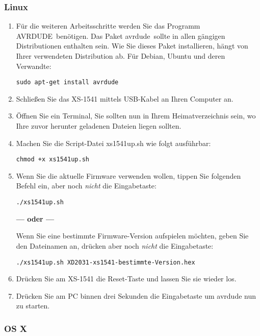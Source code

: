 \documentclass[10pt,a4paper]{scrartcl}		%
\begin{document}
\subsubsection*{Linux}
\begin{enumerate}
\item Für die weiteren Arbeitsschritte werden Sie das Programm
\glqq AVRDUDE\grqq\ benötigen.  
Das Paket \glqq avrdude\grqq\ sollte in allen gängigen Distributionen
enthalten sein. Wie Sie dieses Paket installieren, hängt von Ihrer
verwendeten Distribution ab. Für Debian, Ubuntu und deren Verwandte:

\texttt{sudo apt-get install avrdude}

\item Schließen Sie das XS-1541 mittels USB-Kabel an Ihren Computer an.
\item Öffnen Sie ein Terminal, Sie sollten nun in Ihrem Heimatverzeichnis
sein, wo Ihre zuvor herunter geladenen Dateien liegen sollten.
\item Machen Sie die Script-Datei xs1541up.sh wie folgt ausführbar:

\texttt{chmod +x xs1541up.sh}
\item Wenn Sie die aktuelle Firmware verwenden wollen, tippen Sie
	folgenden Befehl ein, aber noch \textit{nicht} die 
	Eingabetaste:

	\texttt{./xs1541up.sh}

	\textbf{--- oder ---}

	Wenn Sie eine bestimmte Firmware-Version aufspielen möchten, geben
	Sie den Dateinamen an, drücken aber noch \textit{nicht}
	die Eingabetaste:

	\texttt{./xs1541up.sh XD2031-xs1541-bestimmte-Version.hex}
\item Drücken Sie am XS-1541 die Reset-Taste und lassen Sie sie wieder los.
\item Drücken Sie am PC binnen drei Sekunden die Eingabetaste um
	avrdude nun zu starten.
\end{enumerate}
\subsubsection*{OS X}
\end{document}
